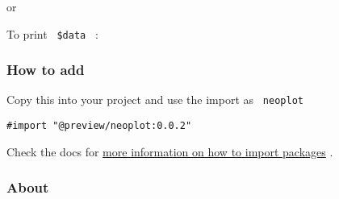 \begin{Shaded}
\begin{Highlighting}[]
\NormalTok{    \textasciigrave{}\textasciigrave{}\textasciigrave{}}
\NormalTok{)}
\end{Highlighting}
\end{Shaded}

or

\begin{Shaded}
\begin{Highlighting}[]
\NormalTok{)}
\end{Highlighting}
\end{Shaded}

To print \texttt{\ \$data\ } :

\begin{Shaded}
\begin{Highlighting}[]
\end{Highlighting}
\end{Shaded}

\subsubsection{How to add}\label{how-to-add}

Copy this into your project and use the import as \texttt{\ neoplot\ }

\begin{verbatim}
#import "@preview/neoplot:0.0.2"
\end{verbatim}



Check the docs for
\href{https://typst.app/docs/reference/scripting/\#packages}{more
information on how to import packages} .

\subsubsection{About}\label{about}

